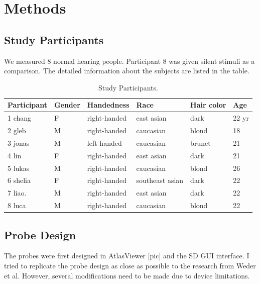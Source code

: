 \chapter{Methods}
\section {Study Participants}
We measured 8 normal hearing people. Participant 8 was given silent stimuli as a comparison. The detailed information about the subjects are listed in the table.

\begin{table}[h!]
  \begin{center}
    
    
    \begin{tabular}{p{2.3cm} | p{1.5cm} |p{3cm} | p{3cm} | p{2.5cm} | p{1cm}} %
      \textbf{Participant} & \textbf {Gender}& \textbf{Handedness} & \textbf{Race} & \textbf{Hair color} &\textbf {Age}\\ 
      \hline
      1 chang  & F & right-handed & east asian & dark & 22 yr \\
      2 gleb    & M & right-handed  & caucasian & blond & 18 \\
      3 jonas  & M & left-handed &  caucasian & brunet & 21\\
      4 lin      & F  & right-handed & east asian & dark& 21 \\
      5 lukas & M & right-handed  &  caucasian& blond & 26 \\
      6 shelia&  F & right-handed & southeast asian & dark & 22 \\
      7 liao.   &  M & right-handed &  east asian & dark & 22 \\
      8 luca & M & right-handed  & caucasian & blond & 22 \\
    \end{tabular}
    \label{tab:table1}
    \caption{Study Participants.}
  \end{center}
  
\end{table}

\section {Probe Design}
The probes were first designed in AtlasViewer [pic] \cite {10.1117/1.NPh.2.2.020801} and the SD GUI interface. I tried to replicate the probe design as close as possible to the research from Weder et al. However, several modifications need to be made due to device limitations.

